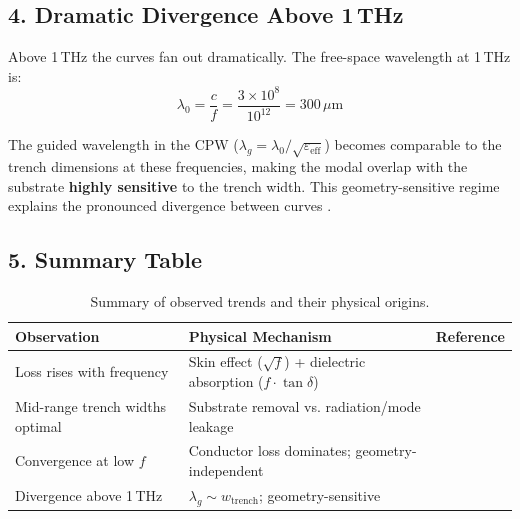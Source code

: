 \subsection*{4. Dramatic Divergence Above 1\,THz}

Above 1\,THz the curves fan out dramatically. The free-space wavelength at 1\,THz is:
\begin{equation}
    \lambda_0 = \frac{c}{f} = \frac{3 \times 10^8}{10^{12}} = 300\,\mu\text{m}
\end{equation}

The guided wavelength in the CPW ($\lambda_g = \lambda_0 / \sqrt{\varepsilon_{\mathrm{eff}}}$) becomes comparable to the trench dimensions at these frequencies, making the modal overlap with the substrate \textbf{highly sensitive} to the trench width. This geometry-sensitive regime explains the pronounced divergence between curves \cite{jos_substrate_modes}.

\subsection*{5. Summary Table}

\begin{table}[h]
\centering
\begin{tabular}{|l|l|l|}
\hline
\textbf{Observation} & \textbf{Physical Mechanism} & \textbf{Reference} \\
\hline
Loss rises with frequency & Skin effect ($\sqrt{f}$) + dielectric absorption ($f \cdot \tan\delta$) & \cite{kagoshima_anomalous, ucl_thz_substrates} \\
\hline
Mid-range trench widths optimal & Substrate removal vs. radiation/mode leakage & \cite{arxiv_trenched_resonators, chalmers_cpw} \\
\hline
Convergence at low $f$ & Conductor loss dominates; geometry-independent & \cite{tampere_cpw} \\
\hline
Divergence above 1\,THz & $\lambda_g \sim w_{\mathrm{trench}}$; geometry-sensitive & \cite{jos_substrate_modes, researchgate_cpw_radiation} \\
\hline
\end{tabular}
\caption{Summary of observed trends and their physical origins.}
\end{table}

